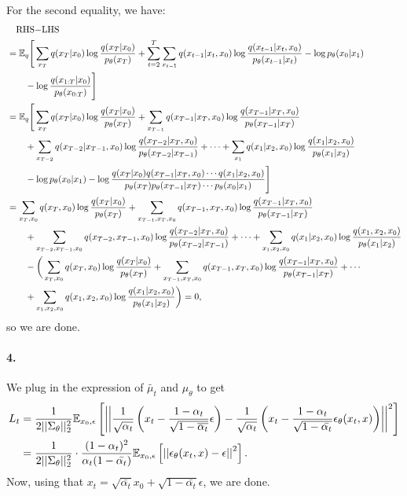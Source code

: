\documentclass[a4 paper,12pt]{article}
\begin{document}
For the second equality, we have:
\begin{align*}
&\quad\text{RHS$-$LHS}\\
&=\mathbb{E}_{q}\Bigg[\sum_{x_T}q(x_T|x_0)\log \frac{q(x_T|x_0)}{p_\theta(x_T)}+\sum_{t=2}^T \sum_{x_{t-1}}q(x_{t-1}|x_t,x_0)\log \frac{q(x_{t-1}|x_t,x_0)}{p_\theta(x_{t-1}|x_t)}-\log p_{\theta}(x_0|x_1)\\
&\qquad -\log \frac{q(x_{1:T}|x_0)}{p_\theta(x_{0:T})}\Bigg]\\
&=\mathbb{E}_{q}\Bigg[\sum_{x_T}q(x_T|x_0)\log \frac{q(x_T|x_0)}{p_\theta(x_T)}+\sum_{x_{T-1}}q(x_{T-1}|x_T,x_0)\log \frac{q(x_{T-1}|x_T,x_0)}{p_\theta(x_{T-1}|x_T)}\\
&\qquad +\sum_{x_{T-2}}q(x_{T-2}|x_{T-1},x_0)\log \frac{q(x_{T-2}|x_T,x_0)}{p_\theta(x_{T-2}|x_{T-1})}+\cdots+\sum_{x_{1}}q(x_{1}|x_2,x_0)\log \frac{q(x_{1}|x_2,x_0)}{p_\theta(x_{1}|x_2)}\\
&\qquad -\log p_{\theta}(x_0|x_1)-\log \frac{q(x_T|x_0)q(x_{T-1}|x_T,x_0)\cdots q(x_1|x_2,x_0)}{p_\theta(x_T)p_\theta(x_{T-1}|x_T)\cdots p_\theta(x_0|x_1)}\Bigg]\\
&=\sum_{x_T,x_0}q(x_T,x_0)\log \frac{q(x_T|x_0)}{p_\theta(x_T)}+\sum_{x_{T-1},x_T,x_0}q(x_{T-1},x_T,x_0)\log \frac{q(x_{T-1}|x_T,x_0)}{p_\theta(x_{T-1}|x_T)}\\
&\qquad +\sum_{x_{T-2},x_{T-1},x_0}q(x_{T-2},x_{T-1},x_0)\log \frac{q(x_{T-2}|x_T,x_0)}{p_\theta(x_{T-2}|x_{T-1})}+\cdots+\sum_{x_{1},x_2,x_0}q(x_{1}|x_2,x_0)\log \frac{q(x_{1},x_2,x_0)}{p_\theta(x_{1}|x_2)}\\
&\qquad -\bigg(\sum_{x_T,x_0}q(x_T,x_0)\log \frac{q(x_T|x_0)}{p_\theta(x_T)}+\sum_{x_{T-1},x_T,x_0}q(x_{T-1},x_T,x_0)\log \frac{q(x_{T-1}|x_T,x_0)}{p_\theta(x_{T-1}|x_T)}+\cdots\\
&\qquad +\sum_{x_1,x_2,x_0}q(x_1,x_2,x_0)\log \frac{q(x_{1}|x_2,x_0)}{p_\theta(x_{1}|x_2)}\bigg)=0,
\end{align*} so we are done.
\paragraph*{4.}
We plug in the expression of $\tilde{\mu_t}$ and $\mu_\theta$ to get
\begin{align*}
L_t&=\frac{1}{2||\Sigma_\theta||_2^2}\mathbb{E}_{x_0,\epsilon}\left[\left|\left|\frac{1}{\sqrt{\alpha_t}}\left(x_t-\frac{1-\alpha_t}{\sqrt{1-\overline{\alpha_t}}}\epsilon\right)-\frac{1}{\sqrt{\alpha_t}}\left(x_t-\frac{1-\alpha_t}{\sqrt{1-\bar{\alpha_t}}}\epsilon_\theta(x_t,x)\right)\right|\right|^2\right]\\
&=\frac{1}{2||\Sigma_\theta||_2^2}\cdot \frac{(1-\alpha_t)^2}{\alpha_t(1-\bar{\alpha_t})}\mathbb{E}_{x_0,\epsilon}\left[\left|\left|\epsilon_\theta(x_t,x)-\epsilon\right|\right|^2\right].
\end{align*} Now, using that $x_t=\sqrt{\bar{\alpha_t}}x_{0}+\sqrt{1-\bar{\alpha_t}}\epsilon$, we are done.
\end{document}
